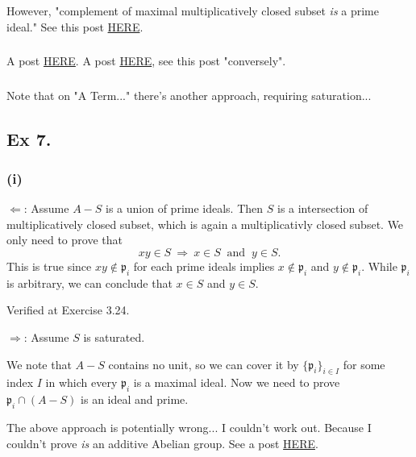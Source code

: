 However, "complement of maximal multiplicatively closed subset \textit{is} a prime ideal." See this post \href{https://math.stackexchange.com/questions/3704318/complement-of-multiplicative-set-is-a-prime-ideal}{HERE}. 

\subsubsection{}
A post \href{https://math.stackexchange.com/questions/25739/complement-of-maximal-multiplicative-set-is-a-prime-ideal}{HERE}. A post \href{https://math.stackexchange.com/questions/3962023/atiyah-macdonald-exercise-3-6}{HERE}, see this post "conversely". 

\subsubsection{}

Note that on "A Term..." there's another approach, requiring saturation... 

\subsection{Ex 7.}\label{Atiyah Chapter 3 Ex 7}

\subsubsection{(i)}

$\Leftarrow$: Assume $A-S$ is a union of prime ideals. Then $S$ is a intersection of multiplicatively closed subset, which is again a multiplicativly closed subset. We only need to prove that 
$$xy\in S ~\Rightarrow~ x\in S ~\text{ and }~ y\in S.$$
This is true since $xy\notin \mathfrak p_i$ for each prime ideals implies $x\notin\mathfrak p_i$ and $y\notin\mathfrak p_i$. While $\mathfrak p_i$ is arbitrary, we can conclude that $x\in S$ and $y\in S$.

Verified at \cite{altman} Exercise 3.24. 

$\Rightarrow$: Assume $S$ is saturated. 

We note that $A-S$ contains no unit, so we can cover it by $\{\mathfrak p_i\}_{i\in I}$ for some index $I$ in which every $\mathfrak p_i$ is a maximal ideal. 
Now we need to prove $\mathfrak p_i\cap (A-S)$ is an ideal and prime. 

The above approach is potentially wrong... I couldn't work out. Because I couldn't prove \textit{is} an additive Abelian group. 
See a post \href{https://math.stackexchange.com/questions/4329999/saturated-set-and-union-of-prime-ideals}{HERE}. 

